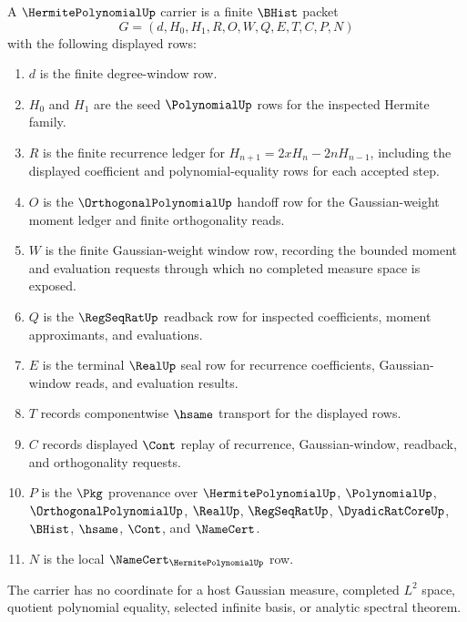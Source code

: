 \begin{definition}
\label{def:hermite-polynomial-carrier}
A $\HermitePolynomialUp$ carrier is a finite $\BHist$ packet
$$
G=(d,H_0,H_1,R,O,W,Q,E,T,C,P,N)
$$
with the following displayed rows:
\begin{enumerate}
\item $d$ is the finite degree-window row.
\item $H_0$ and $H_1$ are the seed $\PolynomialUp$ rows for the inspected Hermite family.
\item $R$ is the finite recurrence ledger for $H_{n+1}=2xH_n-2nH_{n-1}$, including the displayed coefficient and polynomial-equality rows for each accepted step.
\item $O$ is the $\OrthogonalPolynomialUp$ handoff row for the Gaussian-weight moment ledger and finite orthogonality reads.
\item $W$ is the finite Gaussian-weight window row, recording the bounded moment and evaluation requests through which no completed measure space is exposed.
\item $Q$ is the $\RegSeqRatUp$ readback row for inspected coefficients, moment approximants, and evaluations.
\item $E$ is the terminal $\RealUp$ seal row for recurrence coefficients, Gaussian-window reads, and evaluation results.
\item $T$ records componentwise $\hsame$ transport for the displayed rows.
\item $C$ records displayed $\Cont$ replay of recurrence, Gaussian-window, readback, and orthogonality requests.
\item $P$ is the $\Pkg$ provenance over $\HermitePolynomialUp$, $\PolynomialUp$, $\OrthogonalPolynomialUp$, $\RealUp$, $\RegSeqRatUp$, $\DyadicRatCoreUp$, $\BHist$, $\hsame$, $\Cont$, and $\NameCert$.
\item $N$ is the local $\NameCert_{\HermitePolynomialUp}$ row.
\end{enumerate}
The carrier has no coordinate for a host Gaussian measure, completed $L^2$ space, quotient polynomial equality, selected infinite basis, or analytic spectral theorem.
\end{definition}

